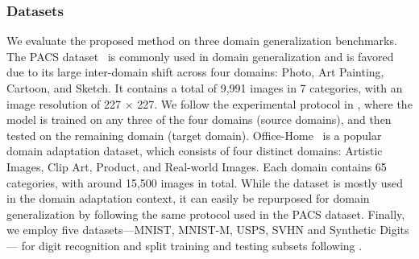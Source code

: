 \documentclass[runningheads]{llncs}
\begin{document}
\begin{table}[t]
	\begin{center}
	\caption{Comparision with the state-of-the-art domain generalization methods (\%) on the Office-Home dataset using a ResNet-18 architecture. Column title indicates the target domain.}
	\label{tab:OH_result}
\end{center}
\end{table}




\subsubsection{Datasets}

We evaluate the proposed method on three domain generalization benchmarks. 
The PACS dataset~\cite{pacs} is commonly used in domain generalization and is favored due to its large inter-domain shift across four domains: Photo, Art Painting, Cartoon, and Sketch. 
It contains a total of 9,991 images in 7 categories, with an image resolution of 227 $\times$ 227. 
We follow the experimental protocol in \cite{pacs}, where the model is trained on any three of the four domains (source domains), and then tested on the remaining domain (target domain). 
Office-Home~\cite{office-home} is a popular domain adaptation dataset, which consists of four distinct domains: Artistic Images, Clip Art, Product, and Real-world Images. 
Each domain contains 65 categories, with around 15,500 images in total. 
While the dataset is mostly used in the domain adaptation context, it can easily be repurposed for domain generalization by following the same protocol used in the PACS dataset. 
Finally, we employ five datasets---MNIST, MNIST-M, USPS, SVHN and Synthetic Digits--- for digit recognition and split training and testing subsets following \cite{xu2018deep}.
\end{document}
